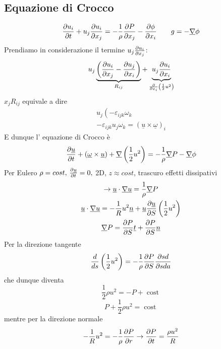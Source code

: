 \subsection{Equazione di Crocco}
\begin{gather*}
  \frac{\partial u_i}{\partial t}+u_j\frac{\partial u_i}{\partial x_j}=-\frac{1}{\rho }\frac{\partial P}{\partial x_j}-\frac{\partial\phi }{\partial x_i}\qquad g = -\underline{\nabla}\phi
\end{gather*}
Prendiamo in considerazione il termine $  u_j\frac{\partial u_i}{\partial x_j} $:
\[
u_j\underbrace{{\left( \frac{\partial u_i}{\partial x_j}-\frac{\partial u_j}{\partial x_i}\right) }}_{R_{ij}} + \underbrace{{u_j\frac{\partial u_i}{\partial x_i}}}_{\frac{\partial}{\partial x_i}\left( \frac{1}{2}u^2\right) }
\]
$ x_jR_{ij} $ equivale a dire
\begin{gather*}
  u_j\left( -\varepsilon_{ijk} \omega _k\\
  -\varepsilon_{ijk} u_j\omega _k = \left( \underline{u}\times \underline{\omega}\right) _i
\end{gather*}
E dunque l' equazione di Crocco è
\begin{equation}
  \label{eq:crocco}
  \frac{\partial\underline{u}}{\partial t} + \left( \underline{\omega}\times \underline{u}\right)  + \underline{\nabla}\left( \frac{1}{2}u^2\right) =-\frac{1}{\rho }\underline{\nabla}P-\underline{\nabla}\phi 
\end{equation}
Per Eulero $ \rho = cost,\, \frac{\partial\underline{u}}{\partial t}=0, $ 2D, $ z \approx cost  $, trascuro effetti dissipativi
\begin{gather*}
  \rightarrow \underline{u} \cdot \underline{\nabla}\underline{u} = \frac{1}{\rho }\underline{\nabla}P\\
  \underline{u}\cdot \underline{\nabla}\underline{u} = -\frac{1}{R}u^2\underline{n}+\underline{u}\frac{\partial\underline{u}}{\partial S}\left( \frac{1}{2}u^2\right) \\
  \underline{\nabla}P = \frac{\partial P}{\partial S}\underline{t}+\frac{\partial P}{\partial S}\underline{n}
\end{gather*}
Per la direzione tangente
\[
\frac{d}{ds}\left( \frac{1}{2}u^2\right) =-\frac{1}{\rho }\frac{\partial P}{\partial S} \frac{\partial sd}{\partial sda}
\]
che dunque diventa
\[
  \frac{1}{2}\rho u^2=-P +\operatorname{cost} 
\]
\begin{equation}
  P+\frac{1}{2}\rho u^2=\operatorname{cost} 
\end{equation}
mentre per la direzione normale
\[
-\frac{1}{R}u^2=-\frac{1}{\rho }\frac{\partial P}{\partial r} \rightarrow \frac{\partial P}{\partial t}=\frac{{\rho u^2}}{R}
\]




